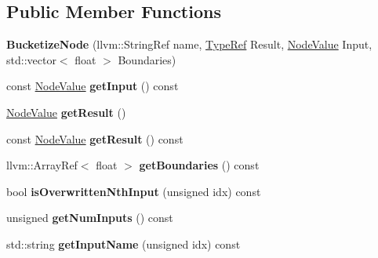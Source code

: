 \subsection*{Public Member Functions}
\begin{DoxyCompactItemize}
\item 
\mbox{\label{classglow_1_1_bucketize_node_a187dc2d2b31259872a22e07325f23623}} 
{\bfseries Bucketize\+Node} (llvm\+::\+String\+Ref name, \hyperlink{structglow_1_1_type}{Type\+Ref} Result, \hyperlink{structglow_1_1_node_value}{Node\+Value} Input, std\+::vector$<$ float $>$ Boundaries)
\item 
\mbox{\label{classglow_1_1_bucketize_node_af92e6498b8ea8ab1a36e9e5d34d43e28}} 
const \hyperlink{structglow_1_1_node_value}{Node\+Value} {\bfseries get\+Input} () const
\item 
\mbox{\label{classglow_1_1_bucketize_node_ab088982b5f8f5e92aabc5e6202154e33}} 
\hyperlink{structglow_1_1_node_value}{Node\+Value} {\bfseries get\+Result} ()
\item 
\mbox{\label{classglow_1_1_bucketize_node_aeb0f79989d2dadd64a717d117e6832dd}} 
const \hyperlink{structglow_1_1_node_value}{Node\+Value} {\bfseries get\+Result} () const
\item 
\mbox{\label{classglow_1_1_bucketize_node_afb1484cbeabe2b07a4de9dc4e4a84e75}} 
llvm\+::\+Array\+Ref$<$ float $>$ {\bfseries get\+Boundaries} () const
\item 
\mbox{\label{classglow_1_1_bucketize_node_a06a77f42f9dd694c978af95bf9e8142f}} 
bool {\bfseries is\+Overwritten\+Nth\+Input} (unsigned idx) const
\item 
\mbox{\label{classglow_1_1_bucketize_node_a09ba7221ae2c30da7fffe8bc421dc86a}} 
unsigned {\bfseries get\+Num\+Inputs} () const
\item 
\mbox{\label{classglow_1_1_bucketize_node_ab0ab0c90f00d80aa80257792406db4b5}} 
std\+::string {\bfseries get\+Input\+Name} (unsigned idx) const
\item 

\end{DoxyCompactItemize}
